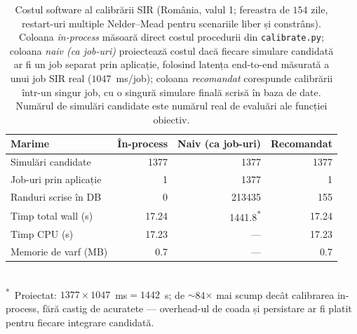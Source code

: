 \begin{table}[!htbp]
\centering
\caption[Cost software calibrare SIR]{Costul software al calibrării SIR (România, valul 1; fereastra de $154$ zile, restart-uri multiple Nelder--Mead pentru scenariile liber și constrâns). Coloana \emph{in-process} măsoară direct costul procedurii din \texttt{calibrate.py}; coloana \emph{naiv (ca job-uri)} proiectează costul dacă fiecare simulare candidată ar fi un job separat prin aplicație, folosind latența end-to-end măsurată a unui job SIR real ($1047$~ms/job); coloana \emph{recomandat} corespunde calibrării într-un singur job, cu o singură simulare finală scrisă în baza de date. Numărul de simulări candidate este numărul real de evaluări ale funcției obiectiv.}
\label{tab:calibration_cost}
\small
\begin{tabularx}{\textwidth}{X r r r}
\toprule
\textbf{Marime} & \textbf{În-process} & \textbf{Naiv (ca job-uri)} & \textbf{Recomandat} \\
\midrule
Simulări candidate & 1377 & 1377 & 1377 \\
Job-uri prin aplicație & 1 & 1377 & 1 \\
Randuri scrise în DB & 0 & 213435 & 155 \\
\midrule
Timp total wall (s) & 17.24 & 1441.8\textsuperscript{*} & 17.24 \\
Timp CPU (s) & 17.23 & --- & 17.23 \\
Memorie de varf (MB) & 0.7 & --- & 0.7 \\
\bottomrule
\end{tabularx}
\\[2pt]\footnotesize\textsuperscript{*}~Proiectat: $1377 \times 1047$~ms${}=1442$~s; de $\sim$84$\times$ mai scump decât calibrarea in-process, fără castig de acuratete --- overhead-ul de coada și persistare ar fi platit pentru fiecare integrare candidată.
\end{table}
